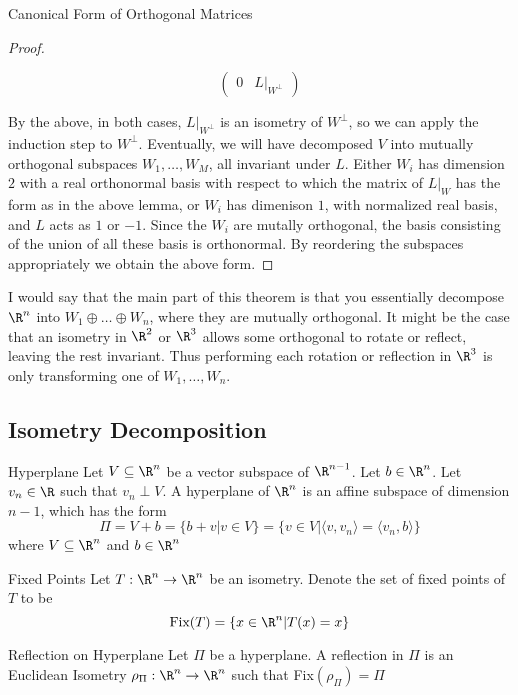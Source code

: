 \documentclass[a4paper]{article}
\begin{document}
\begin{thm}{Canonical Form of Orthogonal Matrices}{}
\begin{proof}
\begin{itemize}
$$\begin{pmatrix}
0 & L|_{W^\perp}
\end{pmatrix}$$
\end{itemize}
By the above, in both cases, $L|_{W^\perp}$ is an isometry of $W^\perp$, so we can apply the induction step to $W^\perp$. Eventually, we will have decomposed $V$ into mutually orthogonal subspaces $W_1,\dots,W_M$, all invariant under $L$. Either $W_i$ has dimension $2$ with a real orthonormal basis with respect to which the matrix of $L|_W$ has the form as in the above lemma, or $W_i$ has dimenison $1$, with normalized real basis, and $L$ acts as $1$ or $-1$. Since the $W_i$ are mutally orthogonal, the basis consisting of the union of all these basis is orthonormal. By reordering the subspaces appropriately we obtain the above form. 
\end{proof}
\end{thm}

I would say that the main part of this theorem is that you essentially decompose $\R^n$ into $W_1\oplus\dots\oplus W_n$, where they are mutually orthogonal. It might be the case that an isometry in $\R^2$ or $\R^3$ allows some orthogonal to rotate or reflect, leaving the rest invariant. Thus performing each rotation or reflection in $\R^3$ is only transforming one of $W_1,\dots,W_n$. 

\subsection{Isometry Decomposition}
\begin{defn}{Hyperplane}{} Let $V\subseteq\R^n$ be a vector subspace of $\R^{n-1}$. Let $b\in\R^n$. Let $v_n\in\R$ such that $v_n\perp V$. A hyperplane of $\R^n$ is an affine subspace of dimension $n-1$, which has the form $$\Pi=V+b=\{b+v|v\in V\}=\{v\in V|\langle v,v_n\rangle=\langle v_n,b\rangle\}$$ where $V\subseteq\R^n$ and $b\in\R^n$
\end{defn}

\begin{defn}{Fixed Points}{} Let $T:\R^n\to\R^n$ be an isometry. Denote the set of fixed points of $T$ to be $$\text{Fix}(T)=\{x\in\R^n|T(x)=x\}$$
\end{defn}

\begin{defn}{Reflection on Hyperplane}{} Let $\Pi$ be a hyperplane. A reflection in $\Pi$ is an Euclidean Isometry $\rho_\Pi:\R^n\to\R^n$ such that Fix$(\rho_\Pi)=\Pi$
\end{defn}
\end{document}
